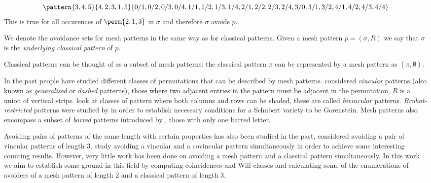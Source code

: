 \begin{equation*}
    \pattern{3,4,5}{4,2,3,1,5}{0/1,0/2,0/3,0/4,
                               1/1,1/2,1/3,1/4,
                               2/1,2/2,2/3,2/4,
                               3/0,3/1,3/2,
                               4/1,4/2,4/3,4/4}
\end{equation*}
This is true for all occurences of \(\perm{2,1,3}\) in \(\sigma\) and
therefore \(\sigma\) avoids \(p\).

We denote the avoidance sets for mesh patterns in the same way as for
classical patterns. Given a mesh pattern \(p=(\sigma,R)\) we say that \(\sigma\) is the \emph{underlying
classical pattern} of \(p\).
\begin{note}
    \label{not:classmesh}
    Classical patterns can be thought of as a subset of mesh patterns: the
    classical pattern \(\pi\) can be represented by a mesh pattern as
    \((\pi,\emptyset)\).
\end{note}

In the past people have studied different classes
of permutations that can be described by mesh patterns. \textcite{babstein2000}
considered \emph{vincular} patterns (also known as \emph{generalised} or \emph{dashed} patterns),
those where two adjacent entries in the pattern must be adjacent in the permutation,
\ie \(R\) is a union of vertical strips.
\textcite{MR2652101} look at classes of pattern where both columns and rows
can be shaded, these are called \emph{bivincular} patterns.
\emph{Bruhat-restricted} patterns were studied by \textcite{MR2264071} in order
to establish necessary conditions for a Schubert variety to be Gorenstein.
Mesh patterns also encompass a subset of \emph{barred} patterns introduced by
\textcite{MR2716312}, those with only one barred letter.

Avoiding pairs of patterns of the same length with certain properties has
also been studied in the past, \textcite{MR2178749} considered avoiding a
pair of vincular patterns of length 3. \textcite{2015arXiv151203226B} study avoiding
a vincular and a covincular pattern simultaneously in order to achieve some
interesting counting results. However, very little work has been done on avoiding
a mesh pattern and a classical pattern simultaneously. In this work we aim to
establish some ground in this field by computing coincidences and Wilf-classes
and calculating some of the enumerations of avoiders of a mesh pattern of length
2 and a classical pattern of length 3.

